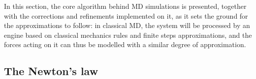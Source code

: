 In this section, the core algorithm behind MD simulations is presented, together with the corrections and refinements implemented on it, as it sets the ground for the approximations to follow:
in classical MD, the system will be processed by an engine based on classical mechanics rules and finite steps approximations, and the forces acting on it can thus be modelled with a similar degree of approximation.

\subsection{The Newton's law}

